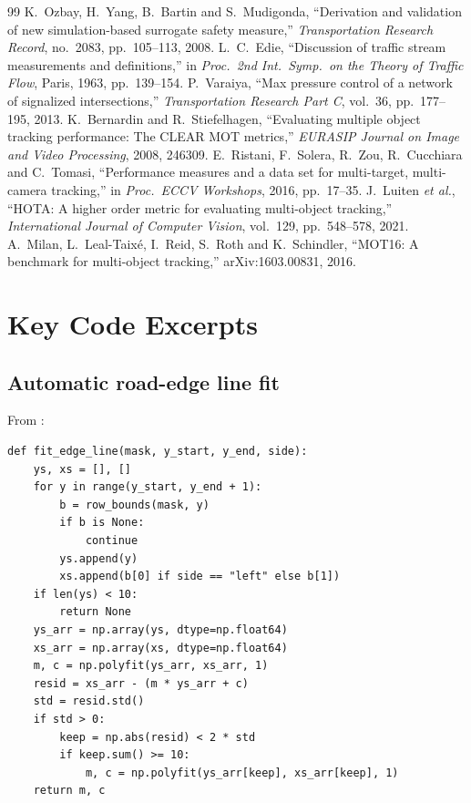 \documentclass[11pt,a4paper]{article}
\DeclareRobustCommand{\file}[1]{\texttt{\detokenize{#1}}}
\begin{document}
\begin{thebibliography}{99}
 K.~Ozbay, H.~Yang, B.~Bartin and S.~Mudigonda, ``Derivation and validation of new simulation-based surrogate safety measure,'' \emph{Transportation Research Record}, no.~2083, pp.~105--113, 2008.
 L.~C.~Edie, ``Discussion of traffic stream measurements and definitions,'' in \emph{Proc.\ 2nd Int.\ Symp.\ on the Theory of Traffic Flow}, Paris, 1963, pp.~139--154.
 P.~Varaiya, ``Max pressure control of a network of signalized intersections,'' \emph{Transportation Research Part C}, vol.~36, pp.~177--195, 2013.
 K.~Bernardin and R.~Stiefelhagen, ``Evaluating multiple object tracking performance: The CLEAR MOT metrics,'' \emph{EURASIP Journal on Image and Video Processing}, 2008, 246309.
 E.~Ristani, F.~Solera, R.~Zou, R.~Cucchiara and C.~Tomasi, ``Performance measures and a data set for multi-target, multi-camera tracking,'' in \emph{Proc.\ ECCV Workshops}, 2016, pp.~17--35.
 J.~Luiten \emph{et al.}, ``HOTA: A higher order metric for evaluating multi-object tracking,'' \emph{International Journal of Computer Vision}, vol.~129, pp.~548--578, 2021.
 A.~Milan, L.~Leal-Taix\'{e}, I.~Reid, S.~Roth and K.~Schindler, ``MOT16: A benchmark for multi-object tracking,'' arXiv:1603.00831, 2016.
\end{thebibliography}

\appendix
\section{Key Code Excerpts}
\subsection{Automatic road-edge line fit}
From \file{homo_IPM.py}:
\begin{lstlisting}[style=py]
def fit_edge_line(mask, y_start, y_end, side):
    ys, xs = [], []
    for y in range(y_start, y_end + 1):
        b = row_bounds(mask, y)
        if b is None:
            continue
        ys.append(y)
        xs.append(b[0] if side == "left" else b[1])
    if len(ys) < 10:
        return None
    ys_arr = np.array(ys, dtype=np.float64)
    xs_arr = np.array(xs, dtype=np.float64)
    m, c = np.polyfit(ys_arr, xs_arr, 1)
    resid = xs_arr - (m * ys_arr + c)
    std = resid.std()
    if std > 0:
        keep = np.abs(resid) < 2 * std
        if keep.sum() >= 10:
            m, c = np.polyfit(ys_arr[keep], xs_arr[keep], 1)
    return m, c
\end{lstlisting}
\end{document}
